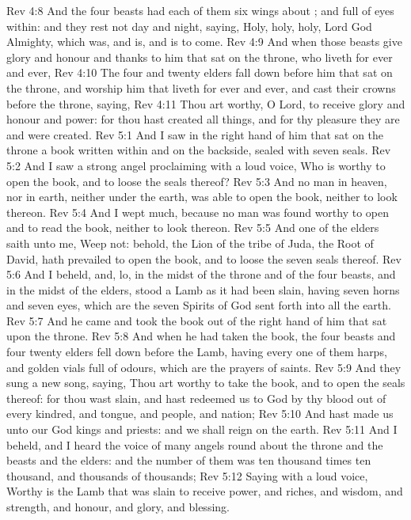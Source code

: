 \vs Rev 4:8 And the four beasts had each of them six wings about ; and  full of eyes within: and they rest not day and night, saying, Holy, holy, holy, Lord God Almighty, which was, and is, and is to come.
\vs Rev 4:9 And when those beasts give glory and honour and thanks to him that sat on the throne, who liveth for ever and ever,
\vs Rev 4:10 The four and twenty elders fall down before him that sat on the throne, and worship him that liveth for ever and ever, and cast their crowns before the throne, saying,
\vs Rev 4:11 Thou art worthy, O Lord, to receive glory and honour and power: for thou hast created all things, and for thy pleasure they are and were created.
\vs Rev 5:1 And I saw in the right hand of him that sat on the throne a book written within and on the backside, sealed with seven seals.
\vs Rev 5:2 And I saw a strong angel proclaiming with a loud voice, Who is worthy to open the book, and to loose the seals thereof?
\vs Rev 5:3 And no man in heaven, nor in earth, neither under the earth, was able to open the book, neither to look thereon.
\vs Rev 5:4 And I wept much, because no man was found worthy to open and to read the book, neither to look thereon.
\vs Rev 5:5 And one of the elders saith unto me, Weep not: behold, the Lion of the tribe of Juda, the Root of David, hath prevailed to open the book, and to loose the seven seals thereof.
\vs Rev 5:6 And I beheld, and, lo, in the midst of the throne and of the four beasts, and in the midst of the elders, stood a Lamb as it had been slain, having seven horns and seven eyes, which are the seven Spirits of God sent forth into all the earth.
\vs Rev 5:7 And he came and took the book out of the right hand of him that sat upon the throne.
\vs Rev 5:8 And when he had taken the book, the four beasts and four  twenty elders fell down before the Lamb, having every one of them harps, and golden vials full of odours, which are the prayers of saints.
\vs Rev 5:9 And they sung a new song, saying, Thou art worthy to take the book, and to open the seals thereof: for thou wast slain, and hast redeemed us to God by thy blood out of every kindred, and tongue, and people, and nation;
\vs Rev 5:10 And hast made us unto our God kings and priests: and we shall reign on the earth.
\vs Rev 5:11 And I beheld, and I heard the voice of many angels round about the throne and the beasts and the elders: and the number of them was ten thousand times ten thousand, and thousands of thousands;
\vs Rev 5:12 Saying with a loud voice, Worthy is the Lamb that was slain to receive power, and riches, and wisdom, and strength, and honour, and glory, and blessing.
